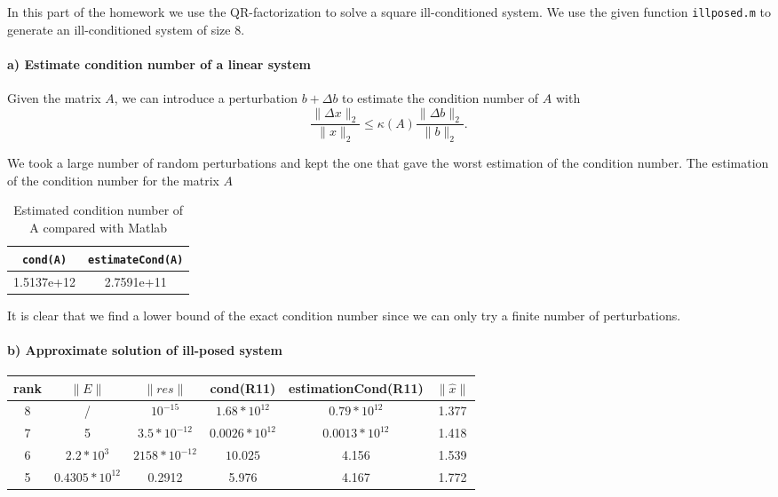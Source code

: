 


In this part of the homework we use the QR-factorization to solve a square ill-conditioned system. We use the given function \texttt{illposed.m} to generate an ill-conditioned system of size 8. 

\paragraph*{a) Estimate condition number of a linear system}

Given the matrix $A$, we can introduce a perturbation $b+\Delta b$ to estimate the condition number of $A$ with 
$$\dfrac{\parallel \Delta x \parallel_2}{\parallel x \parallel_2}\leq\kappa (A)\dfrac{\parallel \Delta b \parallel_2}{\parallel b \parallel_2}.$$

We took a large number of random perturbations and kept the one that gave the worst estimation of the condition number. The estimation of the condition number for the matrix $A$ 

\begin{table}[hb]
\centering
\begin{tabu}{|c|c|}
\hline 
\texttt{cond(A)} & \texttt{estimateCond(A)} \\ 
\hline 
1.5137e+12 & 2.7591e+11 \\ 
\hline 
\end{tabu}
\caption{Estimated condition number of A compared with Matlab}
\end{table} 
It is clear that we find a lower bound of the exact condition number since we can only try a finite number of perturbations.


\paragraph*{b) Approximate solution of ill-posed system}

\begin{center}
\begin{tabular}{|c|c|c|c|c|c|}
\hline 
rank & $\parallel E \parallel$  & $\parallel res \parallel$ &  cond(R11) & estimationCond(R11) & $\parallel \hat{x} \parallel$ \\ 
\hline 
8 & /                  & $10^{-15}$     & $1.68*10^{12}$ & $0.79*10^{12}$      &  1.377 \\ 
\hline 
7 & 5                  & $3.5*10^{-12}$ & $0.0026*10^{12}$ & $0.0013*10^{12}$ &  1.418 \\ 
\hline 
6 & $2.2*10^{3}$         & $2158*10^{-12}$ & $10.025$        & 4.156 &  1.539 \\ 
\hline 
5 & $0.4305*10^{12}$     & 0.2912       & 5.976  & 4.167 &  1.772 \\ 
\hline 
\end{tabular} 
\end{center} 





